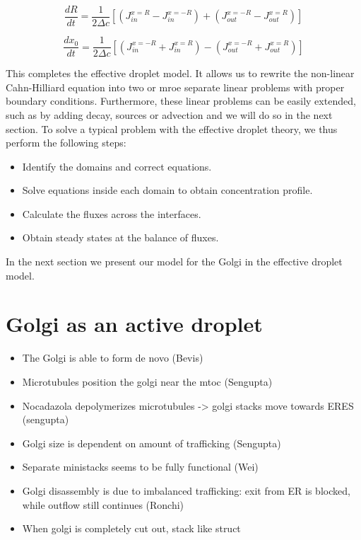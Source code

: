 \documentclass[12pt,a4paper,]{Dissertate}
\providecommand{\tightlist}{%
  \setlength{\itemsep}{0pt}\setlength{\parskip}{0pt}}
\begin{document}
\[
\frac{dR}{dt}=\frac{1}{2\Delta c}\left[(J_{in}^{x=R}-J_{in}^{x=-R})+(J_{out}^{x=-R}-J_{out}^{x=R})\right] 
\]

\[
\frac{dx_0}{dt}=\frac{1}{2\Delta c}\left[(J_{in}^{x=-R}+J_{in}^{x=R})-(J_{out}^{x=-R}+J_{out}^{x=R})\right]
\]

This completes the effective droplet model. It allows us to rewrite the
non-linear Cahn-Hilliard equation into two or mroe separate linear
problems with proper boundary conditions. Furthermore, these linear
problems can be easily extended, such as by adding decay, sources or
advection and we will do so in the next section. To solve a typical
problem with the effective droplet theory, we thus perform the following
steps:

\begin{itemize}
\tightlist
\item
  Identify the domains and correct equations.
\item
  Solve equations inside each domain to obtain concentration profile.
\item
  Calculate the fluxes across the interfaces.
\item
  Obtain steady states at the balance of fluxes.
\end{itemize}

In the next section we present our model for the Golgi in the effective
droplet model.

\hypertarget{golgi-as-an-active-droplet}{%
\section{Golgi as an active droplet}\label{golgi-as-an-active-droplet}}

\begin{itemize}
\tightlist
\item
  The Golgi is able to form de novo (Bevis)
\item
  Microtubules position the golgi near the mtoc (Sengupta)
\item
  Nocadazola depolymerizes microtubules -\textgreater{} golgi stacks
  move towards ERES (sengupta)
\item
  Golgi size is dependent on amount of trafficking (Sengupta)
\item
  Separate ministacks seems to be fully functional (Wei)
\item
  Golgi disassembly is due to imbalanced trafficking: exit from ER is
  blocked, while outflow still continues (Ronchi)
\item
  When golgi is completely cut out, stack like struct
\end{itemize}
\end{document}
